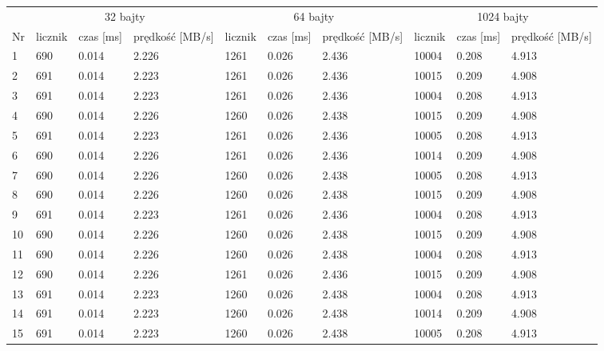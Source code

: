 \documentclass[oneside]{mgr}
\begin{document}
\begin{table}[!h]

\centering
        \begin{tabularx}{\linewidth}{|X|X|X|X|X|X|X|X|X|X|}
        \hline 
         & \multicolumn{3}{|c|}{32 bajty} & \multicolumn{3}{|c|}{64 bajty} & \multicolumn{3}{|c|}{1024 bajty} \\
        \cline{2-10}
{\fontsize{10}{12}\selectfont Nr} & {\fontsize{10}{12}\selectfont licznik} &  {\fontsize{10}{12}\selectfont czas [ms]} & {\fontsize{10}{12}\selectfont prędkość [MB/s]} & {\fontsize{10}{12}\selectfont licznik} & {\fontsize{10}{12}\selectfont czas [ms]} &{\fontsize{10}{12}\selectfont prędkość [MB/s]} & {\fontsize{10}{12}\selectfont licznik} &{\fontsize{10}{12}\selectfont czas [ms]} &{\fontsize{10}{12}\selectfont prędkość [MB/s]} \\
            \hline
1	& 690 &	0.014 &	2.226 &	1261 &	0.026 &	2.436 &	10004 &	0.208 &	4.913 \\
\hline
2 &	691	& 0.014	& 2.223 &	1261 &	0.026 &	2.436 &	10015 &	0.209 &	4.908 \\ \hline
3 &	691	& 0.014	& 2.223 &	1261 &	0.026 &	2.436 &	10004 &	0.208 &	4.913 \\ \hline
4 &	690	& 0.014	& 2.226 &	1260 &	0.026 &	2.438 &	10015 &	0.209 &	4.908 \\ \hline
5 &	691	& 0.014	& 2.223 &	1261 &	0.026 &	2.436 &	10005 &	0.208 &	4.913 \\ \hline
6 &	690	& 0.014	& 2.226 &	1261 &	0.026 &	2.436 &	10014 &	0.209 &	4.908 \\ \hline
7 &	690	& 0.014	& 2.226 &	1260 &	0.026 &	2.438 &	10005 &	0.208 &	4.913 \\ \hline
8 &	690	& 0.014	& 2.226 &	1260 &	0.026 &	2.438 &	10015 &	0.209 &	4.908 \\ \hline
9 &	691	& 0.014	& 2.223 &	1261 &	0.026 &	2.436 &	10004 &	0.208 &	4.913 \\ \hline
10 &	690	& 0.014 &	2.226 &	1260 &	0.026 &	2.438 &	10015 &	0.209 &	4.908 \\ \hline
11 &	690	& 0.014 &	2.226 &	1260 &	0.026 &	2.438 &	10004 &	0.208 &	4.913 \\ \hline
12 &	690	& 0.014 &	2.226 &	1261 &	0.026 &	2.436 &	10015 &	0.209 &	4.908 \\ \hline
13 &	691	& 0.014 &	2.223 &	1260 &	0.026 &	2.438 &	10004 &	0.208 &	4.913 \\ \hline
14 &	691	& 0.014 &	2.223 &	1260 &	0.026 &	2.438 &	10014 &	0.209 &	4.908 \\ \hline
15 &	691	& 0.014 &	2.223 &	1260 &	0.026 &	2.438 &	10005 &	0.208 &	4.913 \\ \hline

\end{tabularx}
\end{table}
\end{document}
